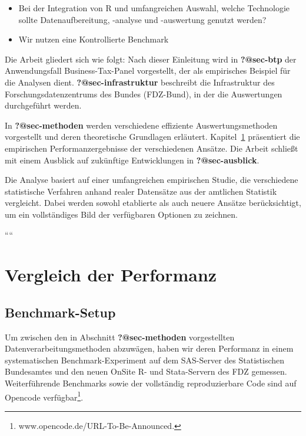 \documentclass[
  german,
  10pt,
  twoside]{article}
\providecommand{\tightlist}{%
  \setlength{\itemsep}{0pt}\setlength{\parskip}{0pt}}
\let\oldref\ref
\renewcommand{\ref}[1]{\oldref{#1}\raisebox{-0.2ex}{\scriptsize\color{wistaBlue}\ding{247}}}
\begin{document}
\begin{itemize}
\tightlist
\item
  Bei der Integration von R und umfangreichen Auswahl, welche
  Technologie sollte Datenaufbereitung, -analyse und -auswertung genutzt
  werden?
\item
  Wir nutzen eine Kontrollierte Benchmark
\end{itemize}

Die Arbeit gliedert sich wie folgt: Nach dieser Einleitung wird in
\textbf{?@sec-btp} der Anwendungsfall Business-Tax-Panel vorgestellt,
der als empirisches Beispiel für die Analysen dient.
\textbf{?@sec-infrastruktur} beschreibt die Infrastruktur des
Forschungsdatenzentrums des Bundes (FDZ-Bund), in der die Auswertungen
durchgeführt werden.

In \textbf{?@sec-methoden} werden verschiedene effiziente
Auswertungsmethoden vorgestellt und deren theoretische Grundlagen
erläutert. Kapitel~\ref{sec-performance} präsentiert die empirischen
Performanzergebnisse der verschiedenen Ansätze. Die Arbeit schließt mit
einem Ausblick auf zukünftige Entwicklungen in \textbf{?@sec-ausblick}.

Die Analyse basiert auf einer umfangreichen empirischen Studie, die
verschiedene statistische Verfahren anhand realer Datensätze aus der
amtlichen Statistik vergleicht. Dabei werden sowohl etablierte als auch
neuere Ansätze berücksichtigt, um ein vollständiges Bild der verfügbaren
Optionen zu zeichnen.

````

\setcounter{subsection}{3}

\section{Vergleich der Performanz}\label{sec-performance}

\subsection{Benchmark-Setup}\label{benchmark-setup}

Um zwischen den in Abschnitt \textbf{?@sec-methoden} vorgestellten
Datenverarbeitungsmethoden abzuwägen, haben wir deren Performanz in
einem systematischen Benchmark-Experiment auf dem SAS-Server des
Statistischen Bundesamtes und den neuen OnSite R- und Stata-Servern des
FDZ gemessen. Weiterführende Benchmarks sowie der vollständig
reproduzierbare Code sind auf Opencode verfügbar\footnote{www.opencode.de/URL-To-Be-Announced.}.
\end{document}

